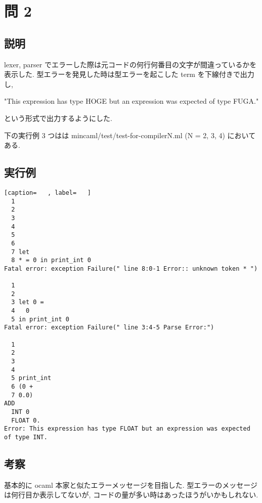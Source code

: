 \documentclass[dvipdfmx]{jsarticle}
\begin{document}
\section*{問 2}
\subsection*{説明}
lexer, parser でエラーした際は元コードの何行何番目の文字が間違っているかを表示した.
型エラーを発見した時は型エラーを起こした term を下線付きで出力し,

"This expression has type HOGE
but an expression was expected of type FUGA."

という形式で出力するようにした.

下の実行例 3 つはは mincaml/test/test-for-compilerN.ml
(N = 2, 3, 4) においてある.
\subsection*{実行例}
\begin{lstlisting}[caption=   , label=   ]
  1 
  2 
  3 
  4 
  5 
  6 
  7 let
  8 * = 0 in print_int 0
Fatal error: exception Failure(" line 8:0-1 Error:: unknown token * ")

  1 
  2 
  3 let 0 =
  4   0
  5 in print_int 0
Fatal error: exception Failure(" line 3:4-5 Parse Error:")

  1 
  2 
  3 
  4 
  5 print_int
  6 (0 +
  7 0.0)
ADD
  INT 0
  FLOAT 0.
Error: This expression has type FLOAT but an expression was expected of type INT.
\end{lstlisting}
\subsection*{考察}
基本的に ocaml 本家と似たエラーメッセージを目指した. 型エラーのメッセージは何行目か表示してないが,
コードの量が多い時はあったほうがいかもしれない.
\end{document}
